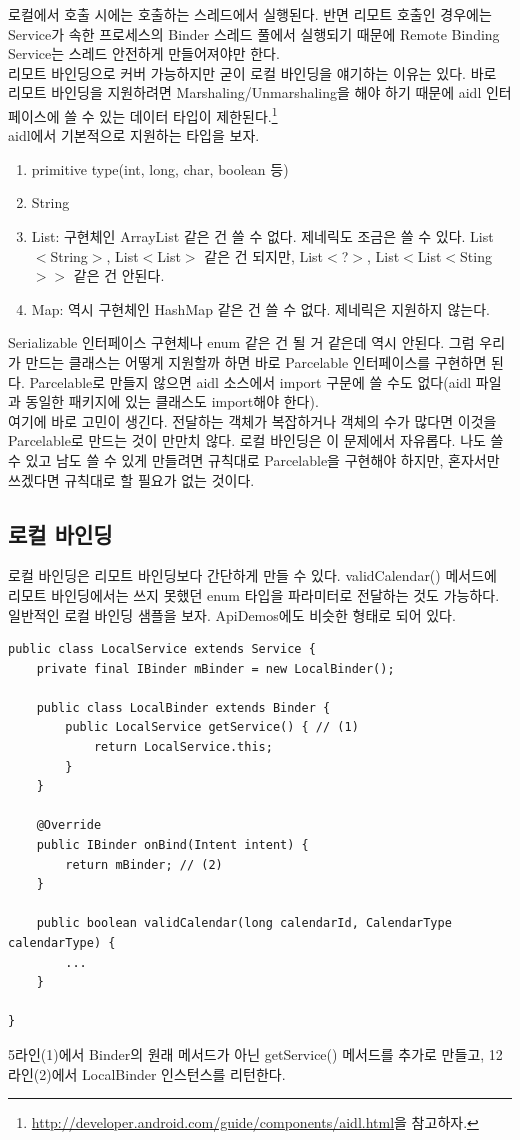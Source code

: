 로컬에서 호출 시에는 호출하는 스레드에서 실행된다. 
반면 리모트 호출인 경우에는 Service가 속한 프로세스의 Binder 스레드 풀에서 실행되기 때문에 Remote Binding Service는 스레드 안전하게 만들어져야만 한다.\\

리모트 바인딩으로 커버 가능하지만 굳이 로컬 바인딩을 얘기하는 이유는 있다. 
바로 리모트 바인딩을 지원하려면 Marshaling/Unmarshaling을 해야 하기 때문에 
aidl 인터페이스에 쓸 수 있는 데이터 타입이 제한된다.\footnote{\url{http://developer.android.com/guide/components/aidl.html}을 참고하자.}\\

aidl에서 기본적으로 지원하는 타입을 보자. 
\begin{enumerate}
\item primitive type(int, long, char, boolean 등)
\item String
\item List: 구현체인 ArrayList 같은 건 쓸 수 없다. 제네릭도 조금은 쓸 수 있다. List$<$String$>$, List$<$List$>$ 같은 건 되지만, List$<$?$>$, List$<$List$<$Sting$>>$ 같은 건 안된다.
\item Map: 역시 구현체인 HashMap 같은 건 쓸 수 없다. 제네릭은 지원하지 않는다.
\end{enumerate}
Serializable 인터페이스 구현체나 enum 같은 건 될 거 같은데 역시 안된다.
그럼 우리가 만드는 클래스는 어떻게 지원할까 하면 바로 Parcelable 인터페이스를 구현하면 된다. 
Parcelable로 만들지 않으면 aidl 소스에서 import 구문에 쓸 수도 없다(aidl 파일과 동일한 패키지에 있는 클래스도 import해야 한다).\\

여기에 바로 고민이 생긴다. 전달하는 객체가 복잡하거나 객체의 수가 많다면 이것을 Parcelable로 만드는 것이 만만치 않다.
로컬 바인딩은 이 문제에서 자유롭다. 나도 쓸 수 있고 남도 쓸 수 있게 만들려면 규칙대로 Parcelable을 구현해야 하지만, 혼자서만 쓰겠다면 규칙대로 할 필요가 없는 것이다.

\subsection{로컬 바인딩}
로컬 바인딩은 리모트 바인딩보다 간단하게 만들 수 있다.
validCalendar() 메서드에 리모트 바인딩에서는 쓰지 못했던 enum 타입을 파라미터로 전달하는 것도 가능하다. 
일반적인 로컬 바인딩 샘플을 보자. ApiDemos에도 비슷한 형태로 되어 있다.
\begin{lstlisting}[frame=single]
public class LocalService extends Service {
	private final IBinder mBinder = new LocalBinder();

	public class LocalBinder extends Binder {
		public LocalService getService() { // (1)
			return LocalService.this;
		}
	}

	@Override
	public IBinder onBind(Intent intent) {
		return mBinder; // (2)
	}

	public boolean validCalendar(long calendarId, CalendarType calendarType) {
		...
	}

}
\end{lstlisting}
5라인(1)에서 Binder의 원래 메서드가 아닌 getService() 메서드를 추가로 만들고, 12라인(2)에서 LocalBinder 인스턴스를 리턴한다.\\


